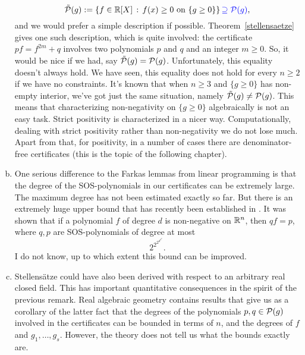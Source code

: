 \begin{enumerate}[(a)]
		\[
		\Tilde{\mathcal{P}}(g):=\left\{ f \in \mathbb{R}[X] \,:\, f(x) \ge 0 \ \text{on} \ \{g \ge 0\} \right\} \textcolor{blue}{\supseteq \mathcal{P}(g)},
		\] 
		and we would prefer a simple description if possible. Theorem~\ref{stellensaetze} gives one such description, which is quite involved: the certificate $p f = f^{2m} + q$ involves two polynomials $p$ and $q$ and an integer $m \ge 0$. So, it would be nice if we had, say $\Tilde{\mathcal{P}}(g)=\mathcal{P}(g)$. Unfortunately, this equality doesn't always hold. We have seen, this equality does not hold for every $n \ge 2$  if we have no constraints. It's known that when $n \ge 3$ and $\{g \ge 0\}$ has non-empty interior, we've got just the same situation, namely $\Tilde{\mathcal{P}}(g) \ne \mathcal{P}(g)$. This means that characterizing non-negativity on $\{g \ge 0\}$ algebraically is not an easy task. Strict positivity is characterized in a nicer way. Computationally, dealing with strict positivity rather than non-negativity we do not lose much. Apart from that, for positivity, in a number of cases there are denominator-free certificates (this is the topic of the following chapter).
		\item One serious difference to the Farkas lemmas from linear programming is that the degree of the SOS-polynomials in our certificates can be extremely large. The maximum degree has not been estimated exactly so far. But there is an extremely huge upper bound that has recently been established in \cite{lombardi2014elementary}. It was shown that if a polynomial $f$ of degree $d$ is non-negative on $\mathbb{R}^n$, then $q f = p$, where $q,p$ are SOS-polynomials of degree at most 
		\[
			2^{2^{2^{d^{4^n}}}}.
		\]
		I do not know, up to which extent this bound can be improved. 
		\item Stellensätze could have also been derived with respect to an arbitrary real closed field. This has important quantitative consequences in the spirit of the previous remark. Real algebraic geometry contains results that give us as a corollary of the latter fact that the degrees of the polynomials $p,q \in \mathcal{P}(g)$ involved in the certificates can be bounded in terms of $n$, and the degrees of $f$ and $g_1,\ldots,g_s$. However, the theory does not tell us what the bounds exactly are. 
	\end{enumerate}


